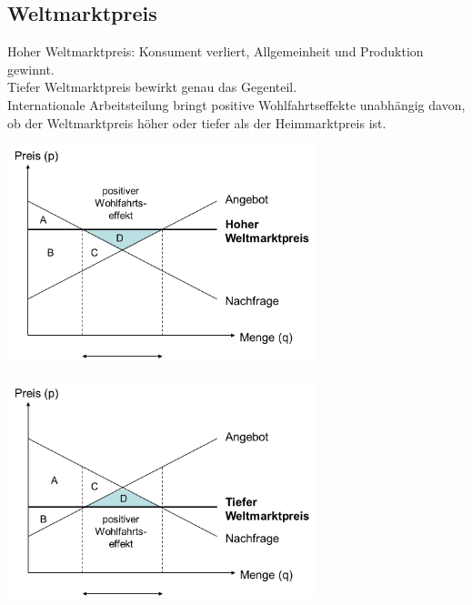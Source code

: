 \subsection{Weltmarktpreis}
Hoher Weltmarktpreis: Konsument verliert, Allgemeinheit und Produktion gewinnt.\\
Tiefer Weltmarktpreis bewirkt genau das Gegenteil.\\
Internationale Arbeitsteilung bringt positive Wohlfahrtseffekte unabhängig
davon, ob der Weltmarktpreis höher oder tiefer als der Heimmarktpreis ist.
\begin{multicols}{2}
	\includegraphics[width=9cm]{images/h03f11.png}\\
	\columnbreak\\
	\includegraphics[width=9cm]{images/h03f13.png}
\end{multicols}
